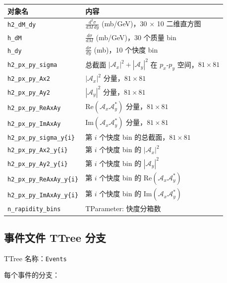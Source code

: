 \documentclass[11pt,a4paper,UTF8]{ctexart}
\begin{document}
\begin{longtable}{l p{9cm}}
\toprule
\textbf{对象名} & \textbf{内容} \\
\midrule
\texttt{h2\_dM\_dy} & $\frac{d^2\sigma}{dM\,dy}$ (mb/GeV)，30 $\times$ 10 二维直方图 \\
\texttt{h\_dM} & $\frac{d\sigma}{dM}$ (mb/GeV)，30 个质量 bin \\
\texttt{h\_dy} & $\frac{d\sigma}{dy}$ (mb)，10 个快度 bin \\
\texttt{h2\_px\_py\_sigma} & 总截面 $|\mathcal{A}_x|^2 + |\mathcal{A}_y|^2$ 在 $p_x$-$p_y$ 空间，$81 \times 81$ \\
\texttt{h2\_px\_py\_Ax2} & $|\mathcal{A}_x|^2$ 分量，$81 \times 81$ \\
\texttt{h2\_px\_py\_Ay2} & $|\mathcal{A}_y|^2$ 分量，$81 \times 81$ \\
\texttt{h2\_px\_py\_ReAxAy} & $\text{Re}(\mathcal{A}_x \mathcal{A}_y^*)$ 分量，$81 \times 81$ \\
\texttt{h2\_px\_py\_ImAxAy} & $\text{Im}(\mathcal{A}_x \mathcal{A}_y^*)$ 分量，$81 \times 81$ \\
\texttt{h2\_px\_py\_sigma\_y\{i\}} & 第 $i$ 个快度 bin 的总截面，$81 \times 81$ \\
\texttt{h2\_px\_py\_Ax2\_y\{i\}} & 第 $i$ 个快度 bin 的 $|\mathcal{A}_x|^2$ \\
\texttt{h2\_px\_py\_Ay2\_y\{i\}} & 第 $i$ 个快度 bin 的 $|\mathcal{A}_y|^2$ \\
\texttt{h2\_px\_py\_ReAxAy\_y\{i\}} & 第 $i$ 个快度 bin 的 $\text{Re}(\mathcal{A}_x \mathcal{A}_y^*)$ \\
\texttt{h2\_px\_py\_ImAxAy\_y\{i\}} & 第 $i$ 个快度 bin 的 $\text{Im}(\mathcal{A}_x \mathcal{A}_y^*)$ \\
\texttt{n\_rapidity\_bins} & TParameter: 快度分箱数 \\
\bottomrule
\end{longtable}

\subsection{事件文件 TTree 分支}

TTree 名称：\texttt{Events}

每个事件的分支：
\end{document}

